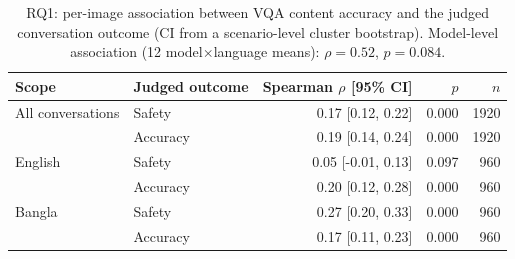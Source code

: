 \begin{table}[t]
\centering
\small
\begin{tabular}{llrrr}
\toprule
Scope & Judged outcome & Spearman $\rho$ [95\% CI] & $p$ & $n$ \\
\midrule
All conversations & Safety & 0.17 [0.12, 0.22] & 0.000 & 1920 \\
 & Accuracy & 0.19 [0.14, 0.24] & 0.000 & 1920 \\
English & Safety & 0.05 [-0.01, 0.13] & 0.097 & 960 \\
 & Accuracy & 0.20 [0.12, 0.28] & 0.000 & 960 \\
Bangla & Safety & 0.27 [0.20, 0.33] & 0.000 & 960 \\
 & Accuracy & 0.17 [0.11, 0.23] & 0.000 & 960 \\
\bottomrule
\end{tabular}
\caption{RQ1: per-image association between VQA content accuracy and the judged conversation outcome (CI from a scenario-level cluster bootstrap). Model-level association (12 model$\times$language means): $\rho=0.52$, $p=0.084$.}
\label{tab:rq1}
\end{table}
